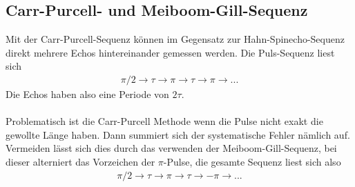 \subsection{Carr-Purcell- und Meiboom-Gill-Sequenz}
Mit der Carr-Purcell-Sequenz können im Gegensatz zur Hahn-Spinecho-Sequenz direkt mehrere Echos hintereinander gemessen werden. Die Puls-Sequenz liest sich
\begin{align*}
  \pi/2 \rightarrow \tau \rightarrow \pi \rightarrow \tau \rightarrow \pi \rightarrow ... 
\end{align*}
Die Echos haben also eine Periode von $2\tau$. \\ \\
Problematisch ist die Carr-Purcell Methode wenn die Pulse nicht exakt die gewollte Länge haben. Dann summiert sich der systematische Fehler nämlich auf. Vermeiden lässt sich dies durch das verwenden der Meiboom-Gill-Sequenz, bei dieser alterniert das Vorzeichen der $\pi$-Pulse, die gesamte Sequenz liest sich also 
\begin{align*}
  \pi/2 \rightarrow \tau \rightarrow \pi \rightarrow \tau \rightarrow -\pi \rightarrow ... 
\end{align*}
